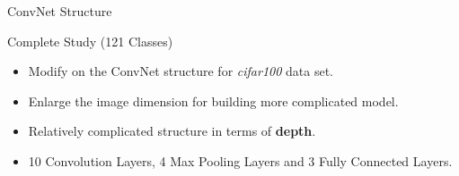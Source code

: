 \documentclass[mathserif]{beamer}
\begin{document}
\begin{frame}{ConvNet Structure}
\vspace{-10pt}
\begin{block}{Complete Study (121 Classes)}
\begin{itemize}
\item Modify on the ConvNet structure for \textit{cifar100} data set.
\item Enlarge the image dimension for building more complicated model.
\item Relatively complicated structure in terms of \textbf{depth}.
\item 10 Convolution Layers, 4 Max Pooling Layers and 3 Fully Connected Layers.
\end{itemize}
\end{block}
\end{frame}


\end{document}
